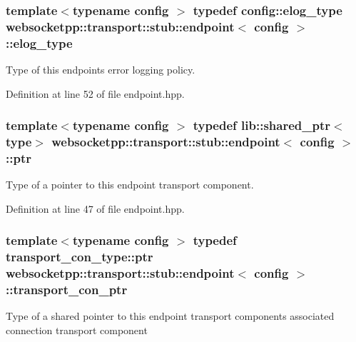 \hypertarget{classwebsocketpp_1_1transport_1_1stub_1_1endpoint_a7890584ddff40571589f62c52bc5b080}{}
\subsubsection[{elog\+\_\+type}]{\setlength{\rightskip}{0pt plus 5cm}template$<$typename config $>$ typedef config\+::elog\+\_\+type {\bf websocketpp\+::transport\+::stub\+::endpoint}$<$ config $>$\+::{\bf elog\+\_\+type}}\label{classwebsocketpp_1_1transport_1_1stub_1_1endpoint_a7890584ddff40571589f62c52bc5b080}


Type of this endpoint\textquotesingle{}s error logging policy. 



Definition at line 52 of file endpoint.\+hpp.

\hypertarget{classwebsocketpp_1_1transport_1_1stub_1_1endpoint_a00a3092b0664dac9cff00785f2b96e88}{}
\subsubsection[{ptr}]{\setlength{\rightskip}{0pt plus 5cm}template$<$typename config $>$ typedef lib\+::shared\+\_\+ptr$<${\bf type}$>$ {\bf websocketpp\+::transport\+::stub\+::endpoint}$<$ config $>$\+::{\bf ptr}}\label{classwebsocketpp_1_1transport_1_1stub_1_1endpoint_a00a3092b0664dac9cff00785f2b96e88}


Type of a pointer to this endpoint transport component. 



Definition at line 47 of file endpoint.\+hpp.

\hypertarget{classwebsocketpp_1_1transport_1_1stub_1_1endpoint_af2bad83f2577d578712642e11767efe1}{}
\subsubsection[{transport\+\_\+con\+\_\+ptr}]{\setlength{\rightskip}{0pt plus 5cm}template$<$typename config $>$ typedef {\bf transport\+\_\+con\+\_\+type\+::ptr} {\bf websocketpp\+::transport\+::stub\+::endpoint}$<$ config $>$\+::{\bf transport\+\_\+con\+\_\+ptr}}\label{classwebsocketpp_1_1transport_1_1stub_1_1endpoint_af2bad83f2577d578712642e11767efe1}
Type of a shared pointer to this endpoint transport component\textquotesingle{}s associated connection transport component 

